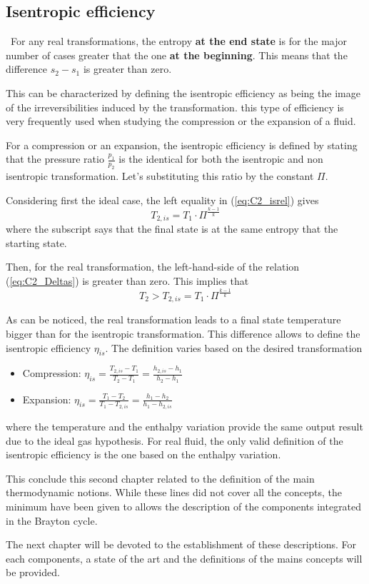 \subsection{Isentropic efficiency} \label{C2:Isen_eff}
\quad\, For any real transformations, the entropy \textbf{at the end state} is for the major number of cases greater that the one \textbf{at the beginning}. This means that the difference $s_2 - s_1$ is greater than zero.

This can be characterized by defining the isentropic efficiency as being the image of the irreversibilities induced by the transformation. this type of efficiency is very frequently used when studying the compression or the expansion of a fluid.

For a compression or an expansion, the isentropic efficiency is defined by stating that the pressure ratio $\frac{p_1}{p_2}$ is the identical for both the isentropic and non isentropic transformation. Let's substituting this ratio by the constant $\Pi$. 

Considering first the ideal case, the left equality in (\ref{eq:C2_isrel}) gives
\begin{equation}
T_{2,is} = T_1\cdot\Pi^\frac{k-1}{k}
\end{equation}
where the subscript says that the final state is at the same entropy that the starting state.

Then, for the real transformation, the left-hand-side of the relation (\ref{eq:C2_Deltas}) is greater than zero. This implies that
\begin{equation}
T_{2} > T_{2,is} = T_1\cdot\Pi^\frac{k-1}{k}
\end{equation}

As can be noticed, the real transformation leads to a final state temperature bigger than for the isentropic transformation. This difference allows to define the isentropic efficiency $\eta_{is}$. The definition varies based on the desired transformation
\begin{itemize}
\item Compression: $\eta_{is}=\frac{T_{2,is}-T_1}{T_2-T_1}=\frac{h_{2,is}-h_1}{h_2-h_1}$
\item Expansion: $\eta_{is}=\frac{T_1-T_{2}}{T_1-T_{2,is}}=\frac{h_1-h_{2}}{h_1-h_{2,is}}$
\end{itemize}
where the temperature and the enthalpy variation provide the same output result due to the ideal gas hypothesis. For real fluid, the only valid definition of the isentropic efficiency is the one based on the enthalpy variation.

This conclude this second chapter related to the definition of the main thermodynamic notions. While these lines did not cover all the concepts, the minimum have been given to allows the description of the components integrated in the Brayton cycle. 

The next chapter will be devoted to the establishment of these descriptions. For each components, a state of the art and the definitions of the mains concepts will be provided. 